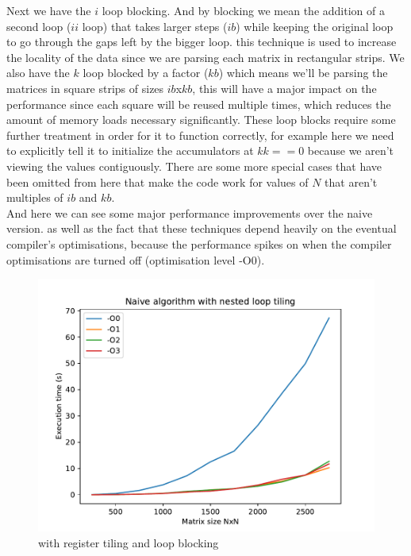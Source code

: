 \documentclass {article}
\begin{document}
Next we have the $i$ loop blocking. And by blocking we mean the addition of
a second loop ($ii$ loop) that takes larger steps ($ib$) while keeping the
original loop to go through the gaps left by the bigger loop. this technique is
used to increase the locality of the data since we are parsing each matrix in
rectangular strips. We also have the $k$ loop blocked by a factor ($kb$) which
means we'll be parsing the matrices in square strips of sizes $ib$x$kb$, this
will have a major impact on the performance since each square will be reused
multiple times, which reduces the amount of memory loads necessary
significantly. These loop blocks require some further treatment in order for
it to function correctly, for example here we need to explicitly tell it to
initialize the accumulators at $kk==0$ because we aren't viewing the values
contiguously. There are some more special cases that have been omitted from
here that make the code work for values of $N$ that aren't multiples of $ib$
and $kb$.\\

And here we can see some major performance improvements over the naive version.
as well as the fact that these techniques depend heavily on the eventual
compiler's optimisations, because the performance spikes on when the compiler
optimisations are turned off (optimisation level -O0).

\begin{figure}[H]
    \includegraphics[width=\linewidth]{plot/with_opt.pdf}
    \caption{with register tiling and loop blocking}
    \label{fig:with_opt}
\end{figure}
\end{document}
